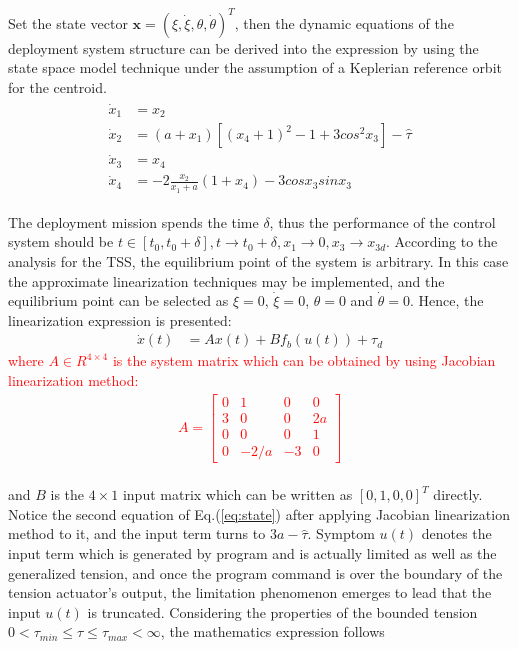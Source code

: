 \documentclass[3p]{elsarticle}
\theoremstyle{plain}
\begin{document}
Set the state vector $\bm{x} = (\xi,\dot\xi,\theta,\dot\theta)^T$, then the dynamic equations of the deployment system structure can be derived into the expression by using the state space model technique under the assumption of a Keplerian reference orbit for the centroid.
\begin{align}
\begin{split}
\dot{x}_1&=x_2\\
\dot{x}_2&=(a+x_1)[(x_4+1)^2-1+3cos{^2x_3}]-\hat{\tau}\\
\dot{x}_3&=x_4\\
\dot{x}_4&=-2\frac{x_2}{x_1+a}(1+x_4)-3cos{x_3}sin{x_3}\label{eq:state}
\end{split}
\end{align}\par
The deployment mission spends the time $\delta$, thus the performance of the control system should be $t\in [t_0,t_0+\delta],t\to t_0+\delta,x_1\to 0,x_3\to x_{3d}$. According to the analysis for the TSS, the equilibrium point of the system is arbitrary. In this case the approximate linearization techniques may be implemented, and the equilibrium point can be selected as $\xi = 0$, $\dot\xi = 0$, $\theta = 0$ and $\dot\theta = 0$. Hence, the linearization expression is presented:
\begin{align}
\dot x(t) &= Ax(t) + Bf_{b}(u(t)) + \tau_d\label{eq:ABC}
\end{align}
\textcolor{red}{where $A\in R^{4\times4}$ is the system matrix which can be obtained by using Jacobian linearization method:
\begin{align}
A=\begin{bmatrix}
0 &1 &0 &0\\
3 &0 &0 &2a\\
0 &0 &0 &1\\
0 &-2/a &-3 &0
\end{bmatrix}
\end{align}}\\
and $B$ is the $4\times1$ input matrix which can be written as $[0,1,0,0]^T$  directly. Notice the second equation of Eq.(\ref{eq:state}) after applying Jacobian linearization method to it, and the input term turns to $3a-\hat{\tau}$. Symptom $u(t)$ denotes the input term which is generated by program and is actually limited as well as the generalized tension, and once the program command is over the boundary of the tension actuator's output, the limitation phenomenon emerges to lead that the input $u(t)$ is truncated. Considering the properties of the bounded tension $0<\tau_{min}\le \tau\le \tau_{max} < \infty$, the mathematics expression follows
\end{document}
